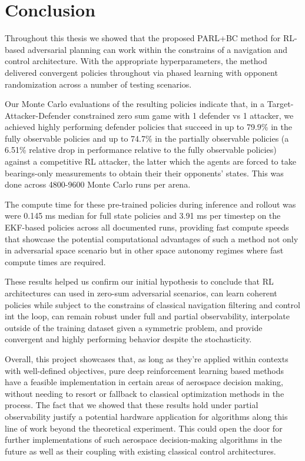 \chapter{Conclusion}

Throughout this thesis we showed that the proposed PARL+BC method for RL-based adversarial planning can work within the constrains of a navigation and control architecture. With the appropriate hyperparameters, the method delivered convergent policies throughout via phased learning with opponent randomization across a number of testing scenarios.




Our Monte Carlo evaluations of the resulting policies indicate that, in a Target-Attacker-Defender constrained zero sum game with   1 defender vs 1 attacker, we achieved highly performing defender policies that succeed in up to 79.9\% in the fully observable policies and up to 74.7\% in the partially observable policies (a 6.51\% relative drop in performance relative to the fully observable policies) against a competitive RL attacker, the latter which the agents are forced to take bearings-only measurements to obtain their their opponents' states. This was done across 4800-9600 Monte Carlo runs per arena.

The compute time for these pre-trained policies during inference and rollout was were 0.145 ms median for full state policies and 3.91 ms per timestep on the EKF-based policies across all documented runs, providing fast compute speeds that showcase the potential computational advantages of such a method not only in adversarial space scenario but in other space autonomy regimes where fast compute times are required.

These results helped us confirm our initial hypothesis to conclude that RL architectures can used in zero-sum adversarial scenarios, can learn coherent policies while subject to the constrains of classical navigation filtering and control int the loop, can remain robust under full and partial observability, interpolate outside of the training dataset given a symmetric problem, and provide convergent and highly performing behavior despite the stochasticity.


Overall, this project showcases that, as long as they're applied within contexts with well-defined objectives, pure deep reinforcement learning based methods have a feasible implementation in certain areas of aerospace decision making, without needing to resort or fallback to classical optimization methods in the process. The fact that we showed that these results hold under partial observability justify a potential hardware application for algorithms along this line of work beyond the theoretical experiment. This could open the door for further implementations of such aerospace decision-making algorithms in the future as well as their coupling with existing classical control architectures.

